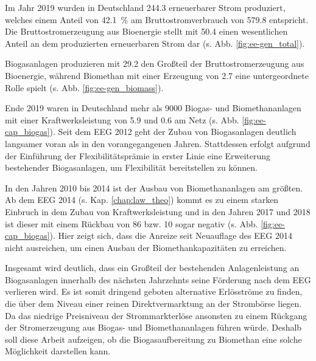 Im Jahr 2019 wurden in Deutschland \SI{244.3}{\twh} erneuerbarer Strom produziert, welches einem Anteil von \SI{42.1}{\percent} am Bruttostromverbrauch von \SI{579.8}{\twh} entspricht. Die Bruttostromerzeugung aus Bioenergie stellt mit \SI{50.4}{\twh} einen wesentlichen Anteil an dem produzierten erneuerbaren Strom dar (s. Abb. \ref{fig:ee-gen_total}). \parencite{BWE2020} 



Biogasanlagen produzieren mit \SI{29.2}{\twh} den Großteil der Bruttostromerzeugung aus Bioenergie, während Biomethan mit einer Erzeugung von \SI{2.7}{\twh} eine untergeordnete Rolle spielt (s. Abb. \ref{fig:ee-gen_biomass}). \parencite{BWE2020} 



Ende 2019 waren in Deutschland mehr als \SI{9000}{\relax} Biogas- und Biomethananlagen mit einer Kraftwerksleistung von \SI{5.9}{\gw} und \SI{0.6}{\gw} am Netz (s. Abb. \ref{fig:ee-cap_biogas}). Seit dem \gls{EEG} \SI{2012}{\relax} geht der Zubau von Biogasanlagen deutlich langsamer voran als in den vorangegangenen Jahren. Stattdessen erfolgt aufgrund der Einführung der Flexibilitätsprämie in erster Linie eine Erweiterung bestehender Biogasanlagen, um Flexibilität bereitstellen zu können. \parencite{BWE2020} \parencite{DanielGromke2019}



In den Jahren 2010 bis \SI{2014}{\relax} ist der Ausbau von Biomethananlagen am größten. Ab dem \gls{EEG} \SI{2014}{\relax} (s. Kap. \ref{chap:law_theo}) kommt es zu einem starken Einbruch in dem Zubau von Kraftwerksleistung und in den Jahren \SI{2017}{\relax} und \SI{2018}{\relax} ist dieser mit einem Rückbau von \SI{86}{\mw} bzw. \SI{10}{\mw} sogar negativ (s. Abb. \ref{fig:ee-cap_biogas}). Hier zeigt sich, dass die Anreize seit Neuauflage des \gls{EEG} \SI{2014}{\relax} nicht ausreichen, um einen Ausbau der Biomethankapazitäten zu erreichen. \parencite{BWE2020} \smallskip

Insgesamt wird deutlich, dass ein Großteil der bestehenden Anlagenleistung an Biogasanlagen innerhalb des nächsten Jahrzehnts seine Förderung nach dem \gls{EEG} verlieren wird. Es ist somit dringend geboten alternative Erlösströme zu finden, die über dem Niveau einer reinen Direktvermarktung an der Strombörse liegen. Da das niedrige Preisniveau der Strommarkterlöse ansonsten zu einem Rückgang der Stromerzeugung aus Biogas- und Biomethananlagen führen würde. Deshalb soll diese Arbeit aufzeigen, ob die Biogasaufbereitung zu Biomethan eine solche Möglichkeit darstellen kann.

